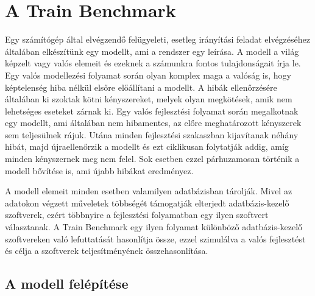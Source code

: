 \chapter{A Train Benchmark}
Egy számítógép által elvégzendő felügyeleti, esetleg irányítási feladat elvégzéséhez általában elkészítünk egy modellt, ami a rendszer egy leírása. A modell a világ képzelt vagy valós elemeit és ezeknek a számunkra fontos tulajdonságait írja le. Egy valós modellezési folyamat során olyan komplex maga a valóság is, hogy képtelenség hiba nélkül elsőre előállítani a modellt. A hibák ellenőrzésére általában ki szoktak kötni kényszereket, melyek olyan megkötések, amik nem lehetséges eseteket zárnak ki. Egy valós fejlesztési folyamat során megalkotnak egy modellt, ami általában nem hibamentes, az előre meghatározott kényszerek sem teljesülnek rájuk. Utána minden fejlesztési szakaszban kijavítanak néhány hibát, majd újraellenőrzik a modellt és ezt ciklikusan folytatják addig, amíg minden kényszernek meg nem felel. Sok esetben ezzel párhuzamosan történik a modell bővítése is, ami újabb hibákat eredményez.

A modell elemeit minden esetben valamilyen adatbázisban tárolják. Mivel az adatokon végzett műveletek többségét támogatják elterjedt adatbázis-kezelő szoftverek, ezért többnyire a fejlesztési folyamatban egy ilyen szoftvert választanak. A Train Benchmark egy ilyen folyamat különböző adatbázis-kezelő szoftvereken való lefuttatását hasonlítja össze, ezzel szimulálva a valós fejlesztést és célja a szoftverek teljesítményének összehasonlítása.

\section{A modell felépítése}

